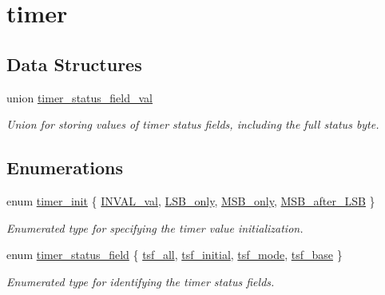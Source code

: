 \hypertarget{group__timer}{}\section{timer}
\label{group__timer}
\subsection*{Data Structures}
\begin{DoxyCompactItemize}
\item 
union \hyperlink{uniontimer__status__field__val}{timer\+\_\+status\+\_\+field\+\_\+val}
\begin{DoxyCompactList}\small\item\em Union for storing values of timer status fields, including the full status byte. \end{DoxyCompactList}\end{DoxyCompactItemize}
\subsection*{Enumerations}
\begin{DoxyCompactItemize}
\item 
enum \hyperlink{group__timer_ga5cc20f14fd50625eea9b20f58fbe2a55}{timer\+\_\+init} \{ \hyperlink{group__timer_gga5cc20f14fd50625eea9b20f58fbe2a55a829d958875d8e92068f1b07f858721a4}{I\+N\+V\+A\+L\+\_\+val}, 
\hyperlink{group__timer_gga5cc20f14fd50625eea9b20f58fbe2a55a9a2e8b22f6d5ee33cc37829164a55955}{L\+S\+B\+\_\+only}, 
\hyperlink{group__timer_gga5cc20f14fd50625eea9b20f58fbe2a55ae46d93c3576b5f78ae1aeb4ee4fc4938}{M\+S\+B\+\_\+only}, 
\hyperlink{group__timer_gga5cc20f14fd50625eea9b20f58fbe2a55a7d392c02b4f52d93c10e4c646f8cedc7}{M\+S\+B\+\_\+after\+\_\+\+L\+SB}
 \}\begin{DoxyCompactList}\small\item\em Enumerated type for specifying the timer value initialization. \end{DoxyCompactList}
\item 
enum \hyperlink{group__timer_gada782f3116a896caaa602b70c0c6d8b7}{timer\+\_\+status\+\_\+field} \{ \hyperlink{group__timer_ggada782f3116a896caaa602b70c0c6d8b7a92376d84969da91547254fc7461f0da2}{tsf\+\_\+all}, 
\hyperlink{group__timer_ggada782f3116a896caaa602b70c0c6d8b7aa89f72faf31fa0e4db8cab25364a4583}{tsf\+\_\+initial}, 
\hyperlink{group__timer_ggada782f3116a896caaa602b70c0c6d8b7aa84c2f6462a2deb90fda229c89453dfa}{tsf\+\_\+mode}, 
\hyperlink{group__timer_ggada782f3116a896caaa602b70c0c6d8b7af4b69eace6b1cc952de198acee4c5e32}{tsf\+\_\+base}
 \}\begin{DoxyCompactList}\small\item\em Enumerated type for identifying the timer status fields. \end{DoxyCompactList}
\end{DoxyCompactItemize}
